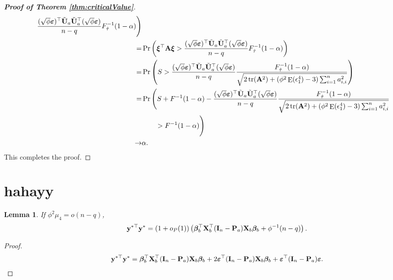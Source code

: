 \documentclass[11pt]{article}
\DeclareMathOperator{\mytr}{tr}
\DeclareMathOperator{\myE}{E}
\newcommand{\By}{\mathbf{y}}    \newcommand{\Bz}{\mathbf{z}}
\newcommand{\BA}{\mathbf{A}}    \newcommand{\BB}{\mathbf{B}}    \newcommand{\BC}{\mathbf{C}}    \newcommand{\BD}{\mathbf{D}}    \newcommand{\BE}{\mathbf{E}}    \newcommand{\BF}{\mathbf{F}}    \newcommand{\BG}{\mathbf{G}}    \newcommand{\BH}{\mathbf{H}}    \newcommand{\BI}{\mathbf{I}}    \newcommand{\BJ}{\mathbf{J}}    \newcommand{\BK}{\mathbf{K}}    \newcommand{\BL}{\mathbf{L}}
\newcommand{\bfsym}[1]{\ensuremath{\boldsymbol{#1}}}
\def\bbeta{\bfsym \beta}
\def\bxi{\bfsym {\xi}}
\theoremstyle{plain}
\newtheorem{lemma}{\quad\quad Lemma}
\theoremstyle{definition}
\theoremstyle{remark}
\begin{document}
\begin{appendices}
\begin{proof}[\textbf{Proof of Theorem \ref{thm:criticalValue}}]
\begin{align*}
            \frac{
            (\sqrt \phi \bepsilon)^\top \tilde \BU_a  \tilde \BU_a^\top (\sqrt \phi \bepsilon)
}{n-q} F^{-1}_{\hat \tau} (1-\alpha)
\Bigg)
            \\
            =&
            \Pr \left( \bxi^\top \BA \bxi  
                >
                \frac{
            (\sqrt \phi \bepsilon)^\top \tilde \BU_a  \tilde \BU_a^\top (\sqrt \phi \bepsilon)
}{n-q}
                F^{-1}_{\hat \tau} (1-\alpha)
            \right)
            \\
            =&
            \Pr \left( S> 
\frac{
            (\sqrt \phi \bepsilon)^\top \tilde \BU_a  \tilde \BU_a^\top (\sqrt \phi \bepsilon)
}{n-q}
            \frac{F^{-1}_{\hat \tau} (1-\alpha)}{
            \sqrt{
    2 \mytr(\BA^2)
    +
    ( \phi^2 \myE (\epsilon_1^4)-3) \sum_{i=1}^n a_{i,i}^2
            }             
    }
             \right) 
             \\
            =& 
            \Pr \Bigg( S+F^{-1}(1-\alpha)-
\frac{
            (\sqrt \phi \bepsilon)^\top \tilde \BU_a  \tilde \BU_a^\top (\sqrt \phi \bepsilon)
}{n-q}
            \frac{F^{-1}_{\hat \tau} (1-\alpha)}{
            \sqrt{
    2 \mytr(\BA^2)
    +
    ( \phi^2 \myE (\epsilon_1^4)-3) \sum_{i=1}^n a_{i,i}^2
            }             
    }
    \\
    &\quad \quad>F^{-1}(1-\alpha)
             \Bigg) 
             \\
             \to&  \alpha
             .
\end{align*}
This completes the proof.

\end{proof}

\section{hahayy}
\begin{lemma}\label{lemma:denom}
If $\phi^2\mu_4=o(n-q)$,
\begin{equation*}
    \By^{*\top} \By^*=(1+o_P(1))
    \left(
    \bbeta_b^\top \BX_b^\top (\BI_n-\BP_a) \BX_b \bbeta_b
    + \phi^{-1}(n-q)
\right).
\end{equation*}
\end{lemma}
\begin{proof}
\begin{equation*}
    \By^{*\top} \By^* = \bbeta_b^\top \BX_b^\top (\BI_n-\BP_a) \BX_b \bbeta_b
    +2 \bepsilon^\top (\BI_n -\BP_a) \BX_b \bbeta_b + \bepsilon^\top (\BI_n - \BP_a) \bepsilon.
\end{equation*}



\end{proof}
\end{appendices}
\end{document}
